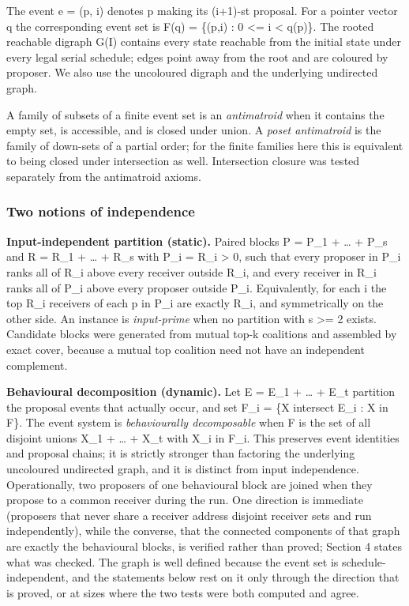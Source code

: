 \documentclass[
  11pt,
]{article}
\begin{document}
The event e = (p, i) denotes p making its (i+1)-st proposal. For a
pointer vector q the corresponding event set is F(q) = \{(p,i) : 0
\textless= i \textless{} q(p)\}. The rooted reachable digraph G(I)
contains every state reachable from the initial state under every legal
serial schedule; edges point away from the root and are coloured by
proposer. We also use the uncoloured digraph and the underlying
undirected graph.

A family of subsets of a finite event set is an \emph{antimatroid} when
it contains the empty set, is accessible, and is closed under union. A
\emph{poset antimatroid} is the family of down-sets of a partial order;
for the finite families here this is equivalent to being closed under
intersection as well. Intersection closure was tested separately from
the antimatroid axioms.

\hypertarget{two-notions-of-independence}{%
\subsubsection{Two notions of
independence}\label{two-notions-of-independence}}

\textbf{Input-independent partition (static).} Paired blocks P = P\_1 +
\ldots{} + P\_s and R = R\_1 + \ldots{} + R\_s with
\textbar P\_i\textbar{} = \textbar R\_i\textbar{} \textgreater{} 0, such
that every proposer in P\_i ranks all of R\_i above every receiver
outside R\_i, and every receiver in R\_i ranks all of P\_i above every
proposer outside P\_i. Equivalently, for each i the top
\textbar R\_i\textbar{} receivers of each p in P\_i are exactly R\_i,
and symmetrically on the other side. An instance is \emph{input-prime}
when no partition with s \textgreater= 2 exists. Candidate blocks were
generated from mutual top-k coalitions and assembled by exact cover,
because a mutual top coalition need not have an independent complement.

\textbf{Behavioural decomposition (dynamic).} Let E = E\_1 + \ldots{} +
E\_t partition the proposal events that actually occur, and set F\_i =
\{X intersect E\_i : X in F\}. The event system is \emph{behaviourally
decomposable} when F is the set of all disjoint unions X\_1 + \ldots{} +
X\_t with X\_i in F\_i. This preserves event identities and proposal
chains; it is strictly stronger than factoring the underlying uncoloured
undirected graph, and it is distinct from input independence.
Operationally, two proposers of one behavioural block are joined when
they propose to a common receiver during the run. One direction is
immediate (proposers that never share a receiver address disjoint
receiver sets and run independently), while the converse, that the
connected components of that graph are exactly the behavioural blocks,
is verified rather than proved; Section 4 states what was checked. The
graph is well defined because the event set is schedule-independent, and
the statements below rest on it only through the direction that is
proved, or at sizes where the two tests were both computed and agree.
\end{document}
